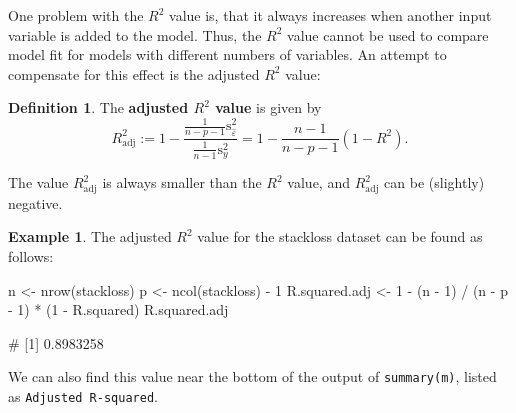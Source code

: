 \documentclass[
  a4paper,
]{article}
\newenvironment{Shaded}{\begin{snugshade}}{\end{snugshade}}
\newcommand{\DecValTok}[1]{\textcolor[rgb]{0.00,0.00,0.81}{#1}}
\newcommand{\FunctionTok}[1]{\textcolor[rgb]{0.00,0.00,0.00}{#1}}
\newcommand{\NormalTok}[1]{#1}
\newcommand{\OtherTok}[1]{\textcolor[rgb]{0.56,0.35,0.01}{#1}}
\newcommand{\SpecialCharTok}[1]{\textcolor[rgb]{0.00,0.00,0.00}{#1}}
\theoremstyle{definition}
\newtheorem{definition}{Definition}[section]
\theoremstyle{definition}
\newtheorem{example}{Example}[section]
\theoremstyle{definition}
\theoremstyle{definition}
\theoremstyle{remark}
\begin{document}
One problem with the \(R^2\) value is, that it always increases when another
input variable is added to the model. Thus, the \(R^2\) value cannot be used
to compare model fit for models with different numbers of variables. An
attempt to compensate for this effect is the adjusted \(R^2\) value:

\begin{definition}
\protect\hypertarget{def:adjusted-R-squared}{}\label{def:adjusted-R-squared}The \textbf{adjusted \(R^2\) value} is given by
\begin{equation*}
  R^2_\mathrm{adj}
  := 1 - \frac{\frac{1}{n-p-1}\mathrm{s}_{\hat\varepsilon}^2}{\frac{1}{n-1}\mathrm{s}_y^2}
  = 1 - \frac{n-1}{n-p-1}(1 - R^2).
\end{equation*}
\end{definition}

The value \(R^2_\mathrm{adj}\) is always smaller than the \(R^2\) value, and
\(R^2_\mathrm{adj}\) can be (slightly) negative.

\begin{example}
The adjusted \(R^2\) value for the stackloss dataset
can be found as follows:

\begin{Shaded}
\begin{Highlighting}[]
\NormalTok{n }\OtherTok{\textless{}{-}} \FunctionTok{nrow}\NormalTok{(stackloss)}
\NormalTok{p }\OtherTok{\textless{}{-}} \FunctionTok{ncol}\NormalTok{(stackloss) }\SpecialCharTok{{-}} \DecValTok{1}
\NormalTok{R.squared.adj }\OtherTok{\textless{}{-}} \DecValTok{1} \SpecialCharTok{{-}}\NormalTok{ (n }\SpecialCharTok{{-}} \DecValTok{1}\NormalTok{) }\SpecialCharTok{/}\NormalTok{ (n }\SpecialCharTok{{-}}\NormalTok{ p }\SpecialCharTok{{-}} \DecValTok{1}\NormalTok{) }\SpecialCharTok{*}\NormalTok{ (}\DecValTok{1} \SpecialCharTok{{-}}\NormalTok{ R.squared)}
\NormalTok{R.squared.adj}
\end{Highlighting}
\end{Shaded}

\begin{Shaded}
\begin{Highlighting}[]
\NormalTok{\# [1] 0.8983258}
\end{Highlighting}
\end{Shaded}

We can also find this value near the bottom of the output of
\texttt{summary(m)}, listed as \texttt{Adjusted\ R-squared}.
\end{example}
\end{document}
